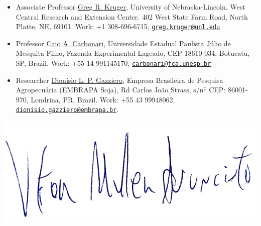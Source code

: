 \documentclass[11pt, a4paper]{awesome-cv}
\begin{document}
\begin{itemize}
\item
  Associate Professor \href{gkruger2@unl.edu}{Greg R. Kruger},
  University of Nebraska-Lincoln. West Central Research and Extension
  Center. 402 West State Farm Road, North Platte, NE, 69101. Work: +1
  308-696-6715,
  \href{mailto:greg.kruger@unl.edu}{\nolinkurl{greg.kruger@unl.edu}}
\item
  Professor \href{carbonari@fca.unesp.br}{Caio A. Carbonari},
  Universidade Estadual Paulista Júlio de Mesquita Filho, Fazenda
  Experimental Lageado, CEP 18610-034, Botucatu, SP, Brazil. Work: +55
  14 991145170,
  \href{mailto:carbonari@fca.unesp.br}{\nolinkurl{carbonari@fca.unesp.br}}
\item
  Researcher \href{dionisio.gazziero@embrapa.br}{Dionísio L. P.
  Gazziero}, Empresa Brasileira de Pesquisa Agropecuária (EMBRAPA Soja),
  Rd Carlos João Strass, s/nº CEP: 86001-970, Londrina, PR, Brazil.
  Work: +55 43 99948062,
  \href{mailto:dionisio.gazziero@embrapa.br}{\nolinkurl{dionisio.gazziero@embrapa.br}}.
\end{itemize}

\includegraphics{../data/signature.png}\\
\end{document}
